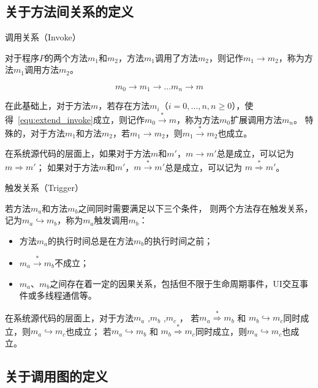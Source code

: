 \subsection{关于方法间关系的定义}
\begin{myDef}
	调用关系（Invoke）
\end{myDef}
	对于程序$P$的两个方法$m_1$和$m_2$，方法$m_1$调用了方法$m_2$，则记作$m_1 \to m_2$，称为方法$m_1$调用方法$m_2$。

\begin{equation}
m_0 \to m_1 \to \dots m_n \to m  \label{equ:extend_invoke}
\end{equation}

在此基础上，对于方法$m$，若存在方法$m_i$（$i=0,\dots,n , n \geqslant 0$），使得~\autoref{equ:extend_invoke}成立，则记作$m_0 \stackrel{\ast}{\to} m$，称为方法$m_0$扩展调用方法$m_n$。
特殊的，对于方法$m_1$和方法$m_2$，若$m_1 \to m_2$，则$m_1  \stackrel{\ast}{\to}  m_2$也成立。

在系统源代码的层面上，如果对于方法$m$和$m'$，$m \to m'$总是成立，可以记为 $m \Rightarrow m'$；
如果对于方法$m$和$m'$，$m  \stackrel{\ast}{\to}  m'$总是成立，可以记为 $m  \stackrel{\ast}{ \Rightarrow } m'$。

\begin{myDef}
	触发关系（Trigger）
\end{myDef}
	
	若方法$m_a$和方法$m_b$之间同时需要满足以下三个条件，
	则两个方法存在触发关系，记为$m_a \hookrightarrow m_b$，称为$m_a$触发调用$m_b$：
	
	\begin{itemize}
		\item 方法$m_a$的执行时间总是在方法$m_b$的执行时间之前；
		\item $m_a \stackrel{\ast}{\to} m_b $不成立；
		\item $m_a$、$m_b$之间存在着一定的因果关系，包括但不限于生命周期事件，UI交互事件或多线程通信等。
	\end{itemize}

在系统源代码的层面上，对于方法$m_a$ ,$m_b$ ,$m_c$ ，
若$m_a  \stackrel{\ast}{ \Rightarrow } m_b$ 和 $m_b \hookrightarrow m_c$同时成立，则$m_a \hookrightarrow m_c$也成立；
若$m_a  \hookrightarrow m_b$ 和 $m_b \stackrel{\ast}{ \Rightarrow }  m_c$同时成立，则$m_a \hookrightarrow m_c$也成立。

\subsection{关于调用图的定义}

